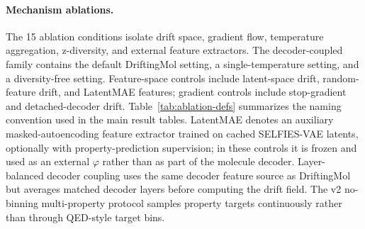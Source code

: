 \documentclass[letterpaper]{article}
\begin{document}
\paragraph{Mechanism ablations.}
The 15 ablation conditions isolate drift space, gradient flow, temperature
aggregation, z-diversity, and external feature extractors. The
decoder-coupled family contains the default DriftingMol setting, a
single-temperature setting, and a diversity-free setting. Feature-space
controls include latent-space drift, random-feature drift, and LatentMAE
features; gradient controls include stop-gradient and detached-decoder drift.
Table~\ref{tab:ablation-defs} summarizes the naming convention used in the
main result tables.
LatentMAE denotes an auxiliary masked-autoencoding feature extractor trained on
cached SELFIES-VAE latents, optionally with property-prediction supervision; in
these controls it is frozen and used as an external $\varphi$ rather than as
part of the molecule decoder. Layer-balanced decoder coupling uses the same
decoder feature source as DriftingMol but averages matched decoder layers
before computing the drift field. The v2 no-binning multi-property protocol
samples property targets continuously rather than through QED-style target
bins.
\end{document}
